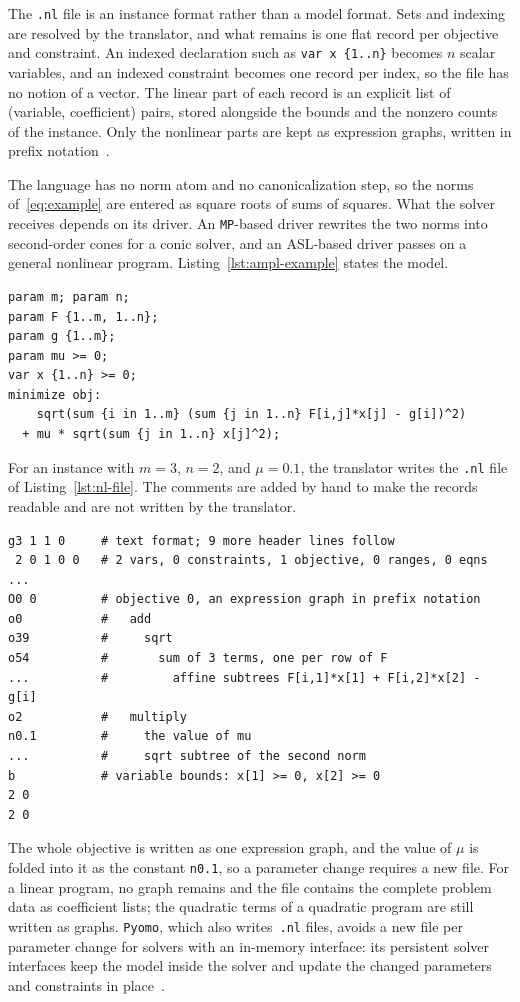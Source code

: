 The \texttt{.nl} file is an instance format rather than a model format. Sets and indexing are
resolved by the translator, and what remains is one flat record per objective and constraint.
An indexed declaration such as \texttt{var x \{1..n\}} becomes $n$ scalar variables, and an
indexed constraint becomes one record per index, so the file has no notion of a vector.
The linear part of each record is an explicit list of (variable, coefficient) pairs, stored
alongside the bounds and the nonzero counts of the instance. Only the nonlinear parts are kept
as expression graphs, written in prefix notation~\cite{gay2005writing}.

The language has no norm atom and no canonicalization step, so the norms of~\eqref{eq:example}
are entered as square roots of sums of squares. What the solver receives
depends on its driver.
An \texttt{MP}-based driver rewrites
the two norms into second-order cones for a conic solver, and an ASL-based driver passes on a
general nonlinear program. Listing~\ref{lst:ampl-example} states the model.
\begin{lstlisting}[language=Ampl, caption={The running example~\eqref{eq:example} in
\texttt{AMPL}.}, label=lst:ampl-example]
param m; param n;
param F {1..m, 1..n};
param g {1..m};
param mu >= 0;
var x {1..n} >= 0;
minimize obj:
    sqrt(sum {i in 1..m} (sum {j in 1..n} F[i,j]*x[j] - g[i])^2)
  + mu * sqrt(sum {j in 1..n} x[j]^2);
\end{lstlisting}
For an instance with $m = 3$, $n = 2$, and $\mu = 0.1$, the translator writes the
\texttt{.nl} file of Listing~\ref{lst:nl-file}. The comments are added by hand to make the
records readable and are not written by the translator.
\begin{lstlisting}[language={}, caption={An abbreviated \texttt{.nl} file for an instance
of the running example.}, label=lst:nl-file]
g3 1 1 0     # text format; 9 more header lines follow
 2 0 1 0 0   # 2 vars, 0 constraints, 1 objective, 0 ranges, 0 eqns
...
O0 0         # objective 0, an expression graph in prefix notation
o0           #   add
o39          #     sqrt
o54          #       sum of 3 terms, one per row of F
...          #         affine subtrees F[i,1]*x[1] + F[i,2]*x[2] - g[i]
o2           #   multiply
n0.1         #     the value of mu
...          #     sqrt subtree of the second norm
b            # variable bounds: x[1] >= 0, x[2] >= 0
2 0
2 0
\end{lstlisting}
The whole objective is written as one expression graph, and the value of $\mu$ is folded into
it as the constant \texttt{n0.1}, so a parameter change requires a new file. For a linear
program, no graph remains and the file contains the complete problem data as coefficient lists;
the quadratic terms of a quadratic program are still written as graphs.
\texttt{Pyomo}, which also writes~\texttt{.nl} files, avoids a new file per parameter change
for solvers with an in-memory interface: its persistent solver interfaces keep the model
inside the solver and update the changed parameters and constraints in
place~\cite{pyomopersistent}.

